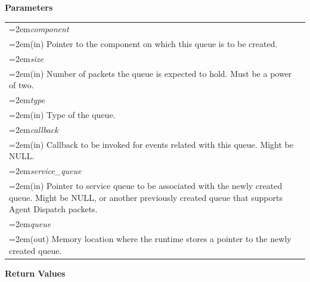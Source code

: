 \documentclass[final]{book}
\newcommand{\hsaarg}[1]{\textit{#1}}
\begin{document}
\noindent\textbf{Parameters}\\[-6mm]
\noindent\begin{longtable}{@{}>{\hangindent=2em}p{\textwidth}}
\hsaarg{component}\\\hspace{2em}(in) Pointer to the component on which this queue is to be created.\\[2mm]
\hsaarg{size}\\\hspace{2em}(in) Number of packets the queue is expected to hold. Must be a power of two.\\[2mm]
\hsaarg{type}\\\hspace{2em}(in) Type of the queue.\\[2mm]
\hsaarg{callback}\\\hspace{2em}(in) Callback to be invoked for events related with this queue. Might be NULL.\\[2mm]
\hsaarg{service_\-queue}\\\hspace{2em}(in) Pointer to service queue to be associated with the newly created queue. Might be NULL, or another previously created queue that supports Agent Dispatch packets.\\[2mm]
\hsaarg{queue}\\\hspace{2em}(out) Memory location where the runtime stores a pointer to the newly created queue.
\end{longtable}
\vspace{-5mm}\noindent\textbf{Return Values}\\[-6mm]
\end{document}
